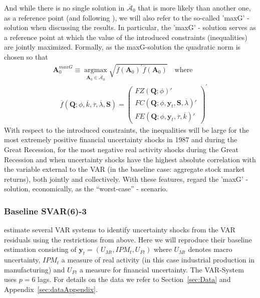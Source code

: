 \documentclass[a4paper,11pt,listof=nochaptergap,oneside,pointednumbers,bibtotoc,bigheadings,liststotoc]{scrbook}
\theoremstyle{mysatz}
\theoremstyle{mydefinition}
\theoremstyle{mytheorem}
\theoremstyle{mybemerkung}
\newcommand{\vect}[1]{\boldsymbol{\mathbf{#1}}}
\begin{document}
And while there is no single solution in $\overline{\vect{\mathcal{A}}}_0$ that is more likely than another one, as a reference point (and following \citealp{ludvigsonetal:18}), we will also refer to the so-called 'maxG' - solution when discussing the results. In particular, the 'maxG' - solution serves as a reference point at which the value of the introduced constraints (inequalities) are jointly maximized. Formally, as the maxG-solution the quadratic norm is chosen so that
\begin{equation} \label{eq:svar_ludvi16}
\begin{split}
\vect{A}_0^{maxG} \equiv \operatorname*{argmax}_{\vect{A}_0 \in \overline{\vect{\mathcal{A}}}_0} \sqrt{\overline{f}(\vect{A}_0)^'\overline{f}(\vect{A}_0)} \quad \text{where} \\
\quad \overline{f}(\vect{Q}; \phi, \overline{k}, \overline{\tau}, \overline{\lambda}, \vect{S}) = \begin{pmatrix}
			FZ(\vect{Q}; \phi)' \\
			FC(\vect{Q}; \phi, \vect{y}_t, \vect{S}, \overline{\lambda})' \\
			FE(\vect{Q}; \phi, \vect{y}_t, \overline{\tau}, \overline{k})'	
		\end{pmatrix}^'
\end{split}								
\end{equation}
With respect to the introduced constraints, the inequalities will be large for the most extremely positive financial uncertainty shocks in 1987 and during the Great Recession, for the most negative real activity shocks during the Great Recession and when uncertainty shocks have the highest absolute correlation with the variable external to the VAR (in the baseline case: aggregate stock market returns), both jointly and collectively. With these features, \citet{ludvigsonetal:18} regard the 'maxG' - solution, economically, as the ``worst-case'' - scenario.

\subsubsection{Baseline SVAR(6)-3}
\citet{ludvigsonetal:18} estimate several VAR systems to identify uncertainty shocks from the VAR residuals using the restrictions from above. Here we will reproduce their baseline estimation consisting of $\vect{y}_t = (U_{Mt}, IPM_{t}, U_{Ft})$ where $U_{Mt}$ denotes macro uncertainty, $IPM_{t}$ a measure of real activity (in this case industrial production in manufacturing) and $U_{Ft}$ a measure for financial uncertainty. The VAR-System uses $p=6$ lags. For details on the data we refer to Section~\ref{sec:Data} and Appendix~\ref{sec:dataAppendix}.
\end{document}
